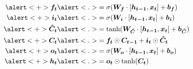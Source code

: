 \documentclass{beamer}
\begin{document}
\begin{frame}
\begin{align*}
\alert<+>{\bm{f_t}} & \alert<.>{=\sigma(\bm{W_f} \cdot [\bm{h_{t-1}}, \bm{x_t}] + \bm{b_f})} \\
\alert<+>{\bm{i_t}} &\alert<.>{= \sigma(\bm{W_i} \cdot [\bm{h_{t-1}}, \bm{x_t}] + \bm{b_i})} \\
\alert<+>{\bm{\tilde{C}_t}} &\alert<.>{= \tanh(\bm{W_{\tilde{C}}} \cdot [\bm{h_{t-1}}, \bm{x_t}] + \bm{b_{\tilde{C}}})} \\
\alert<+>{\bm{C_t}} &\alert<.>{= \bm{f_t} \odot \bm{C_{t-1}} + \bm{i_t} \odot\bm{\tilde{C}_t}} \\
\alert<+>{\bm{o_t}} &\alert<.>{= \sigma(\bm{W_o} \cdot [\bm{h_{t-1}}, \bm{x_t}] + \bm{b_o})} \\
\alert<+>{\bm{h_t}} &\alert<.>{= \bm{o_t} \odot \tanh(\bm{C_t})}
\end{align*}
\end{frame}
\end{document}
